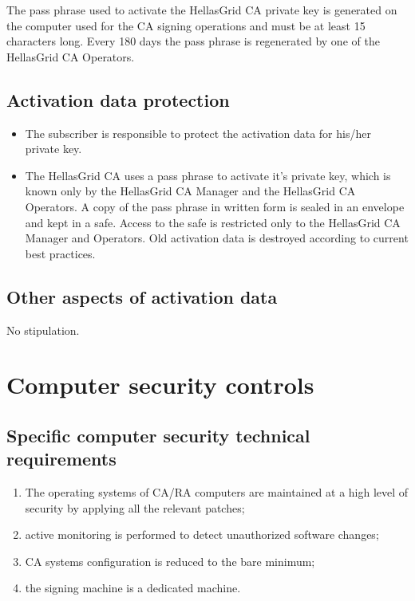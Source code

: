 The pass phrase used to activate the HellasGrid CA private key is generated on the computer used for the CA signing operations and must be at least 15 characters long. Every 180 days the pass phrase is regenerated by one of the HellasGrid CA Operators.

\subsection{Activation data protection}

\begin{itemize}
\item{The subscriber is responsible to protect the activation data for his/her private key.}
\item{The HellasGrid CA uses a pass phrase to activate it's private key, which is known only by the HellasGrid CA Manager and the HellasGrid CA Operators. A copy of the pass phrase in written form  is sealed in an envelope and kept in a safe. Access to the safe is restricted only to the HellasGrid CA Manager and Operators. Old activation data is destroyed according to current best practices.}
\end{itemize}

\subsection{Other aspects of activation data}

No stipulation.

\section{Computer security controls}
\subsection{Specific computer security technical requirements}

\begin{enumerate}
\item{The operating systems of CA/RA computers are maintained at a high level of security by applying all the relevant patches;}
\item{active monitoring is performed to detect unauthorized software changes;}
\item{CA systems configuration is reduced to the bare minimum;}
\item{the signing machine is a dedicated machine.}
\end{enumerate}

